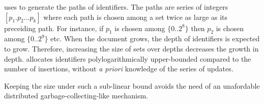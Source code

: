 \CRATE uses \LSEQ to generate the paths of identifiers. The paths are series of
integers $[p_1.p_2\ldots p_k]$ where each path is chosen among a set twice as
large as its preceiding path. For instance, if $p_1$ is chosen among
$\{0..2^8\}$ then $p_2$ is chosen among $\{0..2^9\}$ etc.  When the document
grows, the depth of identifiers is expected to grow. Therefore, increasing the
size of sets over depths decreases the growth in depth.  \LSEQ allocates
identifiers polylogarithmically upper-bounded compared to the number of
insertions, without \emph{a priori} knowledge of the series of updates.

Keeping the size under such a sub-linear bound avoids the need of an unafordable
distributed garbage-collecting-like mechanism.

